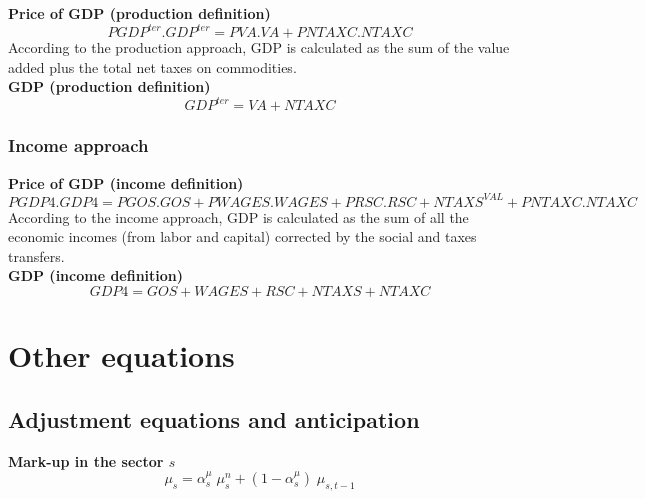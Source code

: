 \documentclass[12pt]{article}
\numberwithin{equation}{section}
\begin{document}
\noindent \textbf{Price of GDP (production definition)} 
\begin{dmath}
PGDP^{ter} . GDP^{ter} = PVA . VA + PNTAXC . NTAXC
\label{SU.mdlPGDPter}
\end{dmath}
According to the production approach, GDP is calculated as the sum of the value added plus the total net taxes on commodities. \\

\noindent \textbf{ GDP (production definition)} 
\begin{dmath}
GDP^{ter} = VA + NTAXC
\label{SU.mdlGDPter}
\end{dmath}



\subsubsection{Income approach}


\noindent \textbf{Price of GDP (income definition)} 
\begin{dmath}
PGDP4 . GDP4 = PGOS . GOS + PWAGES . WAGES + PRSC . RSC + NTAXS^{VAL} + PNTAXC . NTAXC
\label{SU.mdlPGDP4}
\end{dmath}
According to the income approach, GDP is calculated as the sum of all the economic incomes (from labor and capital) corrected by the social and taxes transfers. \\

\noindent \textbf{  GDP (income definition)} 
\begin{dmath}
GDP4 = GOS + WAGES + RSC + NTAXS + NTAXC
\label{SU.mdlGDP4}
\end{dmath}


\section{Other equations}





\subsection{Adjustment equations and anticipation}



\noindent \textbf{Mark-up in the sector $s$} 
\begin{dmath}
\mu_{s} = \alpha^{\mu}_{s} \; \mu^{n}_{s} + \left( 1 - \alpha^{\mu}_{s} \right) \; \mu_{s, t-1}
\label{adjustments.mdlMARKUP[s]}
\end{dmath}
\end{document}
